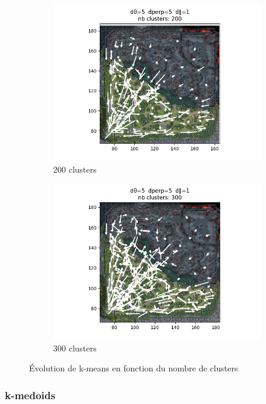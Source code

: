 \begin{figure}[h!]
\begin{subfigure}[b]{0.35\textwidth}
         \centering
         \includegraphics[width=\textwidth]{Images/kmeans/kmeans_200.png}
         \caption{200 clusters}
         \label{fig:kmean_200}
     \end{subfigure}
     \begin{subfigure}[b]{0.35\textwidth}
         \centering
         \includegraphics[width=\textwidth]{Images/kmeans/kmeans_300.png}
         \caption{300 clusters}
         \label{fig:kmeans_300}
     \end{subfigure}
     \caption{Évolution de k-means en fonction du nombre de clusters}
     \label{fig:kmean_nb}
\end{figure}


\subsubsection{k-medoids}

